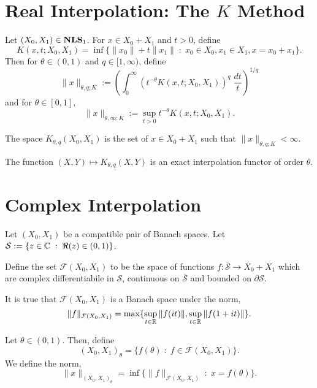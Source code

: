 \section{Real Interpolation: The $K$ Method}
\begin{definition}
    Let $(X_0,X_1) \in \mathrm{\mathbf{NLS}}_1$. For $x \in X_0+X_1$ and $t > 0$, define
    \begin{equation*}
        K(x,t;X_0,X_1) = \inf\{ \|x_0\|+t\|x_1\|\;:\;x_0 \in X_0,x_1 \in X_1,x = x_0+x_1\}.
    \end{equation*}
    Then for $\theta \in (0,1)$ and $q \in [1,\infty)$, define
    \begin{equation*}
        \|x\|_{\theta,q;K} := \left(\int_0^\infty (t^{-\theta}K(x,t;X_0,X_1))^q\;\frac{dt}{t}\right)^{1/q}
    \end{equation*}
    and for $\theta \in [0,1]$,
    \begin{equation*}
        \|x\|_{\theta,\infty;K} := \sup_{t > 0} t^{-\theta} K(x,t;X_0,X_1).
    \end{equation*}
    
    The space $K_{\theta,q}(X_0,X_1)$ is the set of $x \in X_0+X_1$
    such that $\|x\|_{\theta,q;K} < \infty$.
    
\end{definition}

\begin{proposition}
    The function $(X,Y) \mapsto K_{\theta,q}(X,Y)$ is an exact interpolation functor
    of order $\theta$.
\end{proposition}

\section{Complex Interpolation}
\begin{definition}
    Let $(X_0,X_1)$ be a compatible pair of Banach spaces. Let $\mathcal{S} := \{z \in \mathbb{C}\;:\;\Re(z) \in (0,1)\}$. 
    
    Define the set $\mathcal{F}(X_0,X_1)$ to be the space of functions $f:\overline{\mathcal{S}}\rightarrow X_0+X_1$ which are complex differentiabile in $\mathcal{S}$, continuous on $\overline{\mathcal{S}}$
    and bounded on $\partial \mathcal{S}$.
    
    It is true that $\mathcal{F}(X_0,X_1)$ is a Banach space under the norm,
    \begin{equation*}
        \|f\|_{\mathcal{F}(X_0,X_1)} = \max\{\sup_{t \in \mathbb{R}} \|f(it)\|,\sup_{t \in \mathbb{R}}\|f(1+it)\|\}.
    \end{equation*}
    
    Let $\theta \in (0,1)$. Then, define
    \begin{equation*}
        (X_0,X_1)_\theta = \{ f(\theta)\;:\;f \in \mathcal{F}(X_0,X_1)\}.
    \end{equation*}
    We define the norm,
    \begin{equation*}
        \|x\|_{(X_0,X_1)_\theta} = \inf\{\|f\|_{\mathcal{F}(X_0,X_1)} \;:\;x = f(\theta)\}.
    \end{equation*}
\end{definition}

